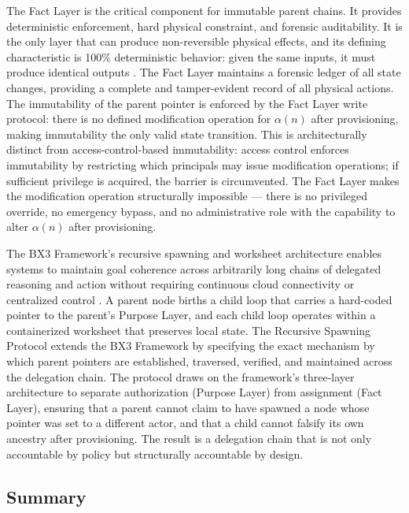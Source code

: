 The Fact Layer is the critical component for immutable parent chains. It provides deterministic enforcement, hard physical constraint, and forensic auditability. It is the only layer that can produce non-reversible physical effects, and its defining characteristic is 100\% deterministic behavior: given the same inputs, it must produce identical outputs \cite{bx3whitepaper2026}. The Fact Layer maintains a forensic ledger of all state changes, providing a complete and tamper-evident record of all physical actions. The immutability of the parent pointer is enforced by the Fact Layer write protocol: there is no defined modification operation for $\alpha(n)$ after provisioning, making immutability the only valid state transition. This is architecturally distinct from access-control-based immutability: access control enforces immutability by restricting which principals may issue modification operations; if sufficient privilege is acquired, the barrier is circumvented. The Fact Layer makes the modification operation structurally impossible — there is no privileged override, no emergency bypass, and no administrative role with the capability to alter $\alpha(n)$ after provisioning.

The BX3 Framework's recursive spawning and worksheet architecture enables systems to maintain goal coherence across arbitrarily long chains of delegated reasoning and action without requiring continuous cloud connectivity or centralized control \cite{bx3whitepaper2026}. A parent node births a child loop that carries a hard-coded pointer to the parent's Purpose Layer, and each child loop operates within a containerized worksheet that preserves local state. The Recursive Spawning Protocol extends the BX3 Framework by specifying the exact mechanism by which parent pointers are established, traversed, verified, and maintained across the delegation chain. The protocol draws on the framework's three-layer architecture to separate authorization (Purpose Layer) from assignment (Fact Layer), ensuring that a parent cannot claim to have spawned a node whose pointer was set to a different actor, and that a child cannot falsify its own ancestry after provisioning. The result is a delegation chain that is not only accountable by policy but structurally accountable by design.

\subsection{Summary}
\label{sec:background-summary}


